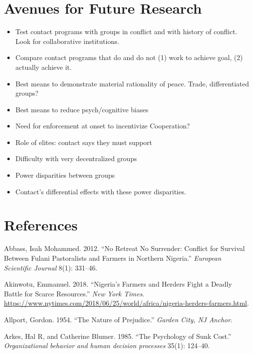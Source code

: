 \documentclass[11pt]{article}
\begin{document}
\hypertarget{avenues-for-future-research}{%
\section{Avenues for Future
Research}\label{avenues-for-future-research}}

\begin{itemize}
\item
  Test contact programs with groups in conflict and with history of
  conflict. Look for collaborative institutions.
\item
  Compare contact programs that do and do not (1) work to achieve goal,
  (2) actually achieve it.
\item
  Best means to demonstrate material rationality of peace. Trade,
  differentiated groups?
\item
  Best means to reduce psych/cognitive biases
\item
  Need for enforcement at onset to incentivize Cooperation?
\item
  Role of elites: contact says they must support
\item
  Difficulty with very decentralized groups
\item
  Power disparities between groups
\item
  Contact's differential effects with these power disparities.
\end{itemize}

\hypertarget{references}{%
\section*{References}\label{references}}

\hypertarget{refs}{}
\leavevmode\hypertarget{ref-abbass2012no}{}%
Abbass, Isah Mohammed. 2012. ``No Retreat No Surrender: Conflict for
Survival Between Fulani Pastoralists and Farmers in Northern Nigeria.''
\emph{European Scientific Journal} 8(1): 331--46.

\leavevmode\hypertarget{ref-nyt2018nigeria}{}%
Akinwotu, Emmanuel. 2018. ``Nigeria's Farmers and Herders Fight a Deadly
Battle for Scarce Resources.'' \emph{New York Times}.
\url{https://www.nytimes.com/2018/06/25/world/africa/nigeria-herders-farmers.html}.

\leavevmode\hypertarget{ref-allport1954prejudice}{}%
Allport, Gordon. 1954. ``The Nature of Prejudice.'' \emph{Garden City,
NJ Anchor}.

\leavevmode\hypertarget{ref-arkes1985psychology}{}%
Arkes, Hal R, and Catherine Blumer. 1985. ``The Psychology of Sunk
Cost.'' \emph{Organizational behavior and human decision processes}
35(1): 124--40.
\end{document}

